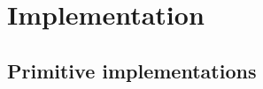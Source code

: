 \section{Implementation}\label{sec:implementation}

\subsection{Primitive  implementations}\label{ssec:primitiveEditorableImpl}



